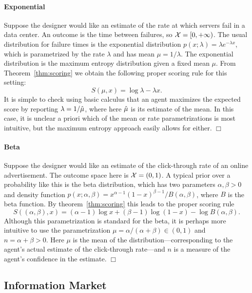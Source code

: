 
\paragraph{Exponential}
Suppose the designer would like an estimate of the rate at which servers fail in a data center. An outcome is the time between failures, so $\mathcal{X} = [0,+\infty)$. The usual distribution for failure times is the exponential distribution $p(x;\lambda) = \lambda e^{-\lambda x}$, which is parametrized by the rate $\lambda$ and has mean $\mu = 1/\lambda$. The exponential distribution is the maximum entropy distribution given a fixed mean $\mu$. From Theorem~\ref{thm:scoring} we obtain the following proper scoring rule for this setting:
%
\[ S(\mu, x) = \log \lambda - \lambda x. \]
%
It is simple to check using basic calculus that an agent maximizes the expected score by reporting $\lambda = 1/\hat{\mu}$, where here $\hat{\mu}$ is its estimate of the mean. In this case, it is unclear a priori which of the mean or rate parametrizations is most intuitive, but the maximum entropy approach easily allows for either. \hfill{$\Box$} 


\paragraph{Beta}
Suppose the designer would like an estimate of the click-through rate of an online advertisement. The outcome space here is $\mathcal{X} = (0,1)$. A typical prior over a probability like this is the beta distribution, which has two parameters $\alpha, \beta > 0$ and density function $p(x; \alpha, \beta) = x^{\alpha-1}(1-x)^{\beta-1}/B(\alpha,\beta)$, where $B$ is the beta function. By theorem~\ref{thm:scoring} this leads to the proper scoring rule
%
\[ S((\alpha, \beta), x) = (\alpha-1)\log x + (\beta-1)\log (1-x) - \log B(\alpha,\beta). \]
%
Although this parametrization is standard for the beta, it is perhaps more intuitive to use the parametrization $\mu = \alpha/(\alpha+\beta) \in (0,1)$ and $n = \alpha+\beta > 0$. Here $\mu$ is the mean of the distribution---corresponding to the agent's actual estimate of the click-through rate---and $n$ is a measure of the agent's confidence in the estimate. \hfill{$\Box$} 



\subsection{Information Market}

